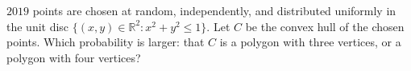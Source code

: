 \documentclass{article}
\begin{document}
\setlength{\parindent}{0pt}
\(\displaystyle 2019\) points are chosen at random, independently, and distributed uniformly in the unit disc \(\displaystyle \{(x,y)\in\mathbb{R}^2\colon x^2+y^2\leq 1\}\). Let \(\displaystyle C\) be the convex hull of the chosen points.  Which probability is larger: that \(\displaystyle C\) is a polygon with three vertices, or a polygon with four vertices?
\end{document}
